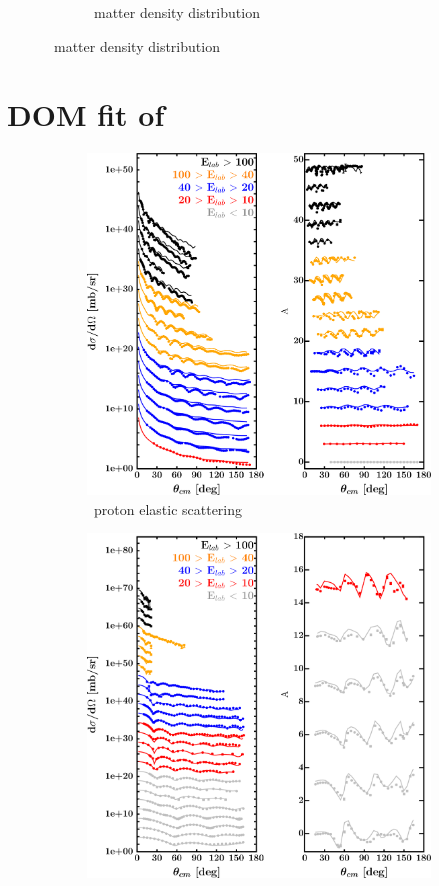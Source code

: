 \begin{figure}[hbtp]
\begin{subfigure}{0.70\textwidth}
        \caption{\snFour\ matter density distribution}
        \label{DOMFitData_sn124_matterDensity}
    \end{subfigure}
\end{figure}

\newpage
\section{DOM fit of \pbEight}
\label{pb208DOMOutput}
\begin{figure}[hbtp]
    \captionsetup[subfigure]{labelformat=empty}
    \centering
    \begin{subfigure}[c]{0.39\textheight}
        \centering
        \includegraphics[width=\linewidth]{figures/pb208_protonElastic.png}
        \caption{\pbEight\ proton elastic scattering}
        \label{DOMFitData_pb208_proton_elastic}
    \end{subfigure}\hspace{6pt}
    \begin{subfigure}[c]{0.39\textheight}
        \centering
        \includegraphics[width=0.52\linewidth]{figures/pb208_neutronElastic.png}

\end{subfigure}
\end{figure}
